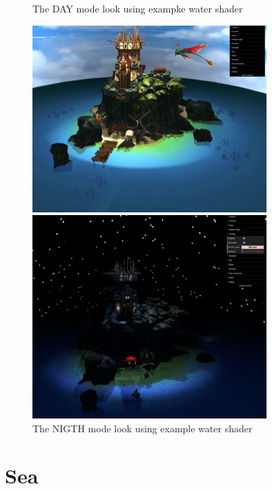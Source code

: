 \documentclass[10pt,a4paper]{article}
\begin{document}
\begin{figure}[H]
\centering
\caption{The DAY mode look using exampke water shader}
\includegraphics[width=0.8\textwidth,keepaspectratio]{day_sea}
\caption{The NIGTH mode look using example water shader}
\includegraphics[width=0.8\textwidth,keepaspectratio]{night_sea}
\end{figure}

\section{Sea}
\end{document}
